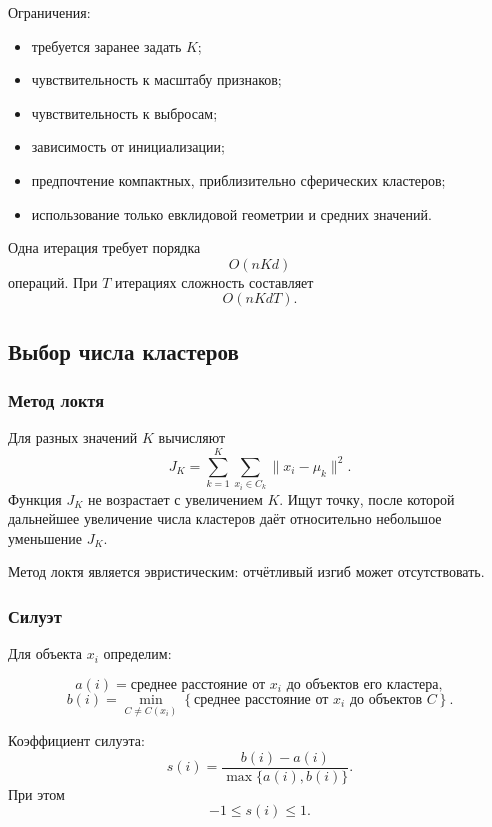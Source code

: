 \documentclass[12pt,a4paper]{article}
\theoremstyle{definition}
\theoremstyle{remark}
\begin{document}
Ограничения:

\begin{itemize}
    \item требуется заранее задать $K$;
    \item чувствительность к масштабу признаков;
    \item чувствительность к выбросам;
    \item зависимость от инициализации;
    \item предпочтение компактных, приблизительно сферических кластеров;
    \item использование только евклидовой геометрии и средних значений.
\end{itemize}

Одна итерация требует порядка
\[
    O(nKd)
\]
операций. При $T$ итерациях сложность составляет
\[
    O(nKdT).
\]

\subsection{Выбор числа кластеров}

\subsubsection{Метод локтя}

Для разных значений $K$ вычисляют
\[
    J_K
    =
    \sum_{k=1}^{K}
    \sum_{x_i\in C_k}
    \|x_i-\mu_k\|^2.
\]
Функция $J_K$ не возрастает с увеличением $K$. Ищут точку, после которой
дальнейшее увеличение числа кластеров даёт относительно небольшое уменьшение
$J_K$.

Метод локтя является эвристическим: отчётливый изгиб может отсутствовать.

\subsubsection{Силуэт}

Для объекта $x_i$ определим:

\[
    a(i)
    =
    \text{среднее расстояние от }x_i
    \text{ до объектов его кластера},
\]
\[
    b(i)
    =
    \min_{C\ne C(x_i)}
    \left\{
        \text{среднее расстояние от }x_i
        \text{ до объектов }C
    \right\}.
\]

Коэффициент силуэта:
\[
    s(i)
    =
    \frac{b(i)-a(i)}{\max\{a(i),b(i)\}}.
\]
При этом
\[
    -1\leq s(i)\leq 1.
\]
\end{document}
